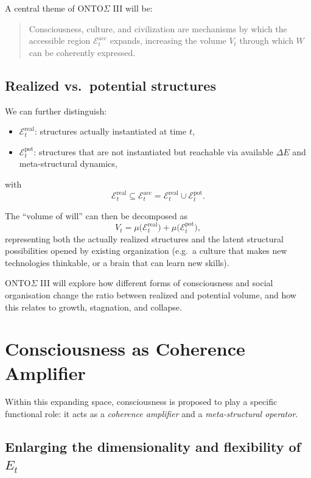 \documentclass[12pt,a4paper]{report}
\newcommand{\Will}{W}
\begin{document}
A central theme of ONTO$\Sigma$ III will be:

\begin{quote}
Consciousness, culture, and civilization are mechanisms by which the accessible region \(\mathcal{E}_t^{\mathrm{acc}}\) expands, increasing the volume \(V_t\) through which \(\Will\) can be coherently expressed.
\end{quote}

\subsection*{Realized vs.\ potential structures}

We can further distinguish:

\begin{itemize}[leftmargin=2em]
    \item \(\mathcal{E}_t^{\mathrm{real}}\): structures actually instantiated at time \(t\),
    \item \(\mathcal{E}_t^{\mathrm{pot}}\): structures that are not instantiated but reachable via available $\Delta E$ and meta-structural dynamics,
\end{itemize}
with
\[
    \mathcal{E}_t^{\mathrm{real}} \subseteq \mathcal{E}_t^{\mathrm{acc}} = 
    \mathcal{E}_t^{\mathrm{real}} \cup \mathcal{E}_t^{\mathrm{pot}}.
\]

The ``volume of will'' can then be decomposed as
\[
    V_t = \mu\bigl(\mathcal{E}_t^{\mathrm{real}}\bigr) 
        + \mu\bigl(\mathcal{E}_t^{\mathrm{pot}}\bigr),
\]
representing both the actually realized structures and the latent structural possibilities opened by existing organization (e.g.\ a culture that makes new technologies thinkable, or a brain that can learn new skills).

ONTO$\Sigma$ III will explore how different forms of consciousness and social organisation change the ratio between realized and potential volume, and how this relates to growth, stagnation, and collapse.

\section{Consciousness as Coherence Amplifier}

Within this expanding space, consciousness is proposed to play a specific functional role: it acts as a \emph{coherence amplifier} and a \emph{meta-structural operator}.

\subsection*{Enlarging the dimensionality and flexibility of \texorpdfstring{$E_t$}{E\_t}}
\end{document}
